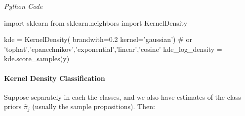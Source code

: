 \emph{Python Code}
\begin{python}
import sklearn 
from sklearn.neighbors import KernelDensity

kde = KernelDensity(
  brandwith=0.2
  kernel='gaussian') # or 'tophat','epanechnikov','exponential','linear','cosine'
kde_log_density = kde.score_samples(y)
\end{python}

\paragraph{Kernel Density Classification}
Suppose  separately in each the classes, and we also have estimates of the class priors
$\hat{\pi}_{j}$ (usually the sample propositions). Then:
\begin{center}
\end{center}


